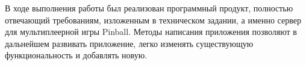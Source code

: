 \Conclusion

В ходе выполнения работы был реализован программный продукт, полностью отвечающий требованиям, изложенным в техническом задании, а именно сервер для мультиплеерной игры Pinball. Методы написания приложения позволяют в дальнейшем развивать приложение, легко изменять существующую функциональность и добавлять новую.
